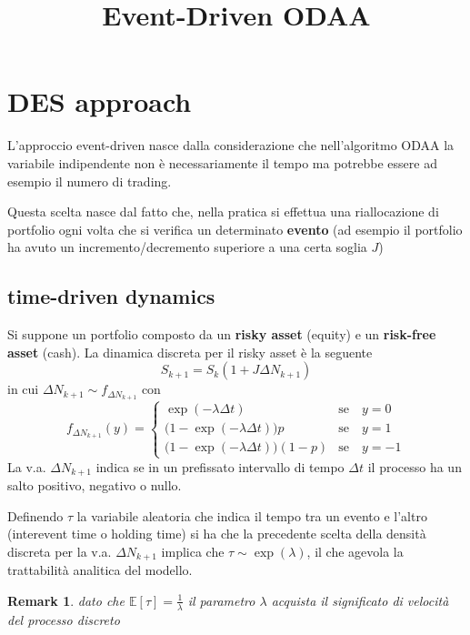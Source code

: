 \documentclass[12pt,a4paper]{article}
\title{Event-Driven ODAA}
\author{}
\theoremstyle{break}
\newtheorem{remark}{Remark}
\begin{document}
\maketitle


\section{DES approach}
L'approccio event-driven nasce dalla considerazione che nell'algoritmo ODAA la variabile indipendente non è necessariamente il tempo ma potrebbe essere ad esempio il numero di trading.

 Questa scelta nasce dal fatto che, nella pratica si effettua una riallocazione di portfolio ogni volta che si verifica un determinato \textbf{evento} (ad esempio il portfolio ha avuto un incremento/decremento superiore a una certa soglia $J$) 
 
 \subsection{time-driven dynamics}
Si suppone un portfolio composto da un \textbf{risky asset} (equity) e un \textbf{risk-free asset} (cash). La dinamica discreta per il risky asset è la seguente 
\begin{equation}
S_{k+1} = S_{k} (1 + J\Delta N_{k+1})
\end{equation}
in cui $\Delta N_{k+1} \sim f_{\Delta N_{k+1}} $ con
\[
f_{\Delta N_{k+1}}(y) = 
\begin{cases}
 \exp(-\lambda\Delta t) & \text{se} \quad y = 0 \\
 \Big(1-\exp(-\lambda\Delta t)\Big)p & \text{se} \quad y = 1 \\
 \Big(1-\exp(-\lambda\Delta t)\Big)(1-p) & \text{se} \quad y = -1
\end{cases}
\]
La v.a. $ \Delta N_{k+1} $ indica se in un prefissato intervallo di tempo $ \Delta t$ il processo ha un salto positivo, negativo o nullo.

Definendo $ \tau $ la variabile aleatoria che indica il tempo tra un evento e l'altro (interevent time o holding time) si ha che la precedente scelta della densità discreta per la v.a. $\Delta N_{k+1} $ implica che $\tau \sim \exp(\lambda)$, il che agevola la trattabilità analitica del modello.


\begin{remark}
	dato che $\mathbb{E}[\tau] = \frac{1}{\lambda}$ il parametro $\lambda$ acquista il significato di velocità del processo discreto
\end{remark}
\end{document}
